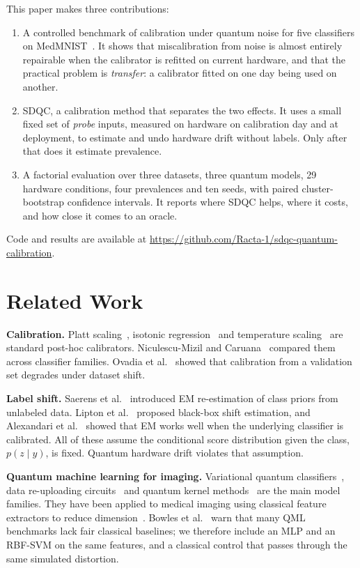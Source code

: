 \documentclass[conference]{IEEEtran}
\begin{document}
This paper makes three contributions:
\begin{enumerate}
\item A controlled benchmark of calibration under quantum noise for five classifiers on MedMNIST~\cite{yang2023}. It shows that miscalibration from noise is almost entirely repairable when the calibrator is refitted on current hardware, and that the practical problem is \emph{transfer}: a calibrator fitted on one day being used on another.
\item SDQC, a calibration method that separates the two effects. It uses a small fixed set of \emph{probe} inputs, measured on hardware on calibration day and at deployment, to estimate and undo hardware drift without labels. Only after that does it estimate prevalence.
\item A factorial evaluation over three datasets, three quantum models, 29 hardware conditions, four prevalences and ten seeds, with paired cluster-bootstrap confidence intervals. It reports where SDQC helps, where it costs, and how close it comes to an oracle.
\end{enumerate}
Code and results are available at \url{https://github.com/Racta-1/sdqc-quantum-calibration}.

\section{Related Work}

\textbf{Calibration.} Platt scaling~\cite{platt1999}, isotonic regression~\cite{zadrozny2002} and temperature scaling~\cite{guo2017} are standard post-hoc calibrators. Niculescu-Mizil and Caruana~\cite{niculescu2005} compared them across classifier families. Ovadia et al.~\cite{ovadia2019} showed that calibration from a validation set degrades under dataset shift.

\textbf{Label shift.} Saerens et al.~\cite{saerens2002} introduced EM re-estimation of class priors from unlabeled data. Lipton et al.~\cite{lipton2018} proposed black-box shift estimation, and Alexandari et al.~\cite{alexandari2020} showed that EM works well when the underlying classifier is calibrated. All of these assume the conditional score distribution given the class, $p(z\mid y)$, is fixed. Quantum hardware drift violates that assumption.

\textbf{Quantum machine learning for imaging.} Variational quantum classifiers~\cite{schuld2020}, data re-uploading circuits~\cite{perez2020} and quantum kernel methods~\cite{havlicek2019} are the main model families. They have been applied to medical imaging using classical feature extractors to reduce dimension~\cite{gupta2025,sunki2025}. Bowles et al.~\cite{bowles2024} warn that many QML benchmarks lack fair classical baselines; we therefore include an MLP and an RBF-SVM on the same features, and a classical control that passes through the same simulated distortion.
\end{document}
